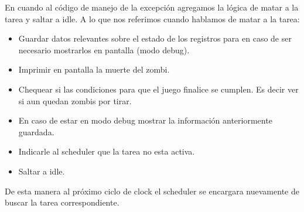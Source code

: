 	En cuando al código de manejo de la excepción agregamos la lógica de matar a la tarea y saltar a idle. A lo que nos referimos cuando hablamos de matar a la tarea:

	\begin{itemize}
		\item{Guardar datos relevantes sobre el estado de los registros para en caso de ser necesario mostrarlos en pantalla (modo debug).}
		\item{Imprimir en pantalla la muerte del zombi.}
		\item{Chequear si las condiciones para que el juego finalice se cumplen. Es decir ver si aun quedan zombis por tirar.}
		\item{En caso de estar en modo debug mostrar la información anteriormente guardada.}
		\item{Indicarle al scheduler que la tarea no esta activa.}
		\item{Saltar a idle.}
	\end{itemize} 

	De esta manera al próximo ciclo de clock el scheduler se encargara nuevamente de buscar la tarea correspondiente.